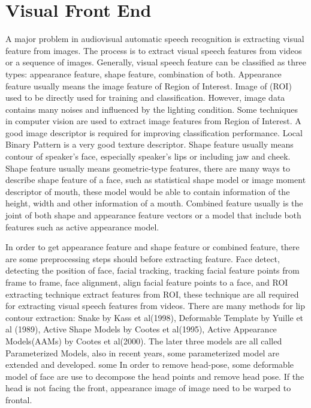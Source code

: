 \section{Visual Front End}
A major problem in audiovisual automatic speech recognition is extracting visual feature from images. The process is to extract visual speech features from videos or a sequence of images. Generally, visual speech feature can be classified as three types: appearance feature, shape feature, combination of both\cite{potamianos2003recent}. Appearance feature usually means the image feature of Region of Interest. Image of (ROI) used to be directly used for training and classification. However, image data contains many noises and influenced by the lighting condition. Some techniques in computer vision are used to extract image features from Region of Interest. A good image descriptor is required for improving classification performance. Local Binary Pattern is a very good texture descriptor. Shape feature usually means contour of speaker's face, especially speaker's lips or including jaw and cheek. Shape feature usually means geometric-type features, there are many ways to describe shape feature of a face, such as statistical shape model or image moment descriptor of mouth, these model would be able to contain information of the height, width and other information of a mouth. Combined feature usually is the joint of both shape and appearance feature vectors or a model that include both features such as active appearance model.

In order to get appearance feature and shape feature or combined feature, there are some preprocessing steps should before extracting feature. Face detect, detecting the position of face, facial tracking, tracking facial feature points from frame to frame, face alignment, align facial feature points to a face, and ROI extracting technique extract features from ROI, these technique are all required for extracting visual speech features from videos. There are many methods for lip contour extraction: Snake by Kass et al(1998), Deformable Template by Yuille et al (1989), Active Shape Models by Cootes et al(1995), Active Appearance Models(AAMs) by Cootes et al(2000). The later three models are all called Parameterized Models, also in recent years, some parameterized model are extended and developed. some In order to remove head-pose, some deformable model of face are use to decompose the head points and remove head pose. If the head is not facing the front, appearance image of image need to be warped to frontal.
